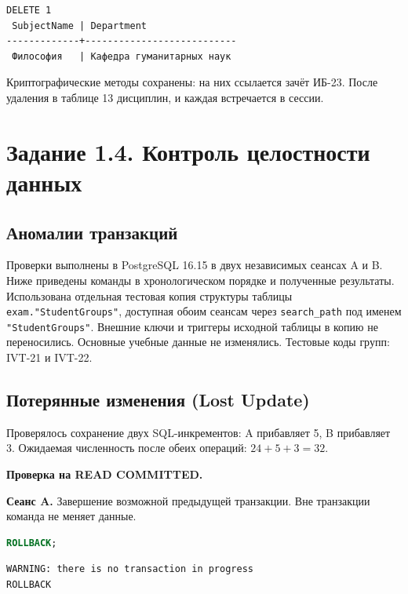 \documentclass[12pt,a4paper]{article}
\begin{document}
\begin{lstlisting}
DELETE 1
 SubjectName | Department
-------------+---------------------------
 Философия   | Кафедра гуманитарных наук
\end{lstlisting}

Криптографические методы сохранены: на них ссылается зачёт ИБ-23. После удаления в таблице 13 дисциплин, и каждая встречается в сессии.

\section*{Задание 1.4. Контроль целостности данных}

\subsection*{Аномалии транзакций}

Проверки выполнены в PostgreSQL 16.15 в двух независимых сеансах A и B. Ниже приведены команды в хронологическом порядке и полученные результаты. Использована отдельная тестовая копия структуры таблицы \texttt{exam."StudentGroups"}, доступная обоим сеансам через \texttt{search\_path} под именем \texttt{"StudentGroups"}. Внешние ключи и триггеры исходной таблицы в копию не переносились. Основные учебные данные не изменялись. Тестовые коды групп: IVT-21 и IVT-22.

\subsection*{Потерянные изменения (Lost Update)}

Проверялось сохранение двух SQL-инкрементов: A прибавляет 5, B прибавляет 3. Ожидаемая численность после обеих операций: \(24+5+3=32\).

\textbf{Проверка на READ COMMITTED.}

\textbf{Сеанс A.} Завершение возможной предыдущей транзакции. Вне транзакции команда не меняет данные.
\begin{lstlisting}[language=SQL]
ROLLBACK;
\end{lstlisting}

\begin{lstlisting}
WARNING: there is no transaction in progress
ROLLBACK
\end{lstlisting}
\end{document}

